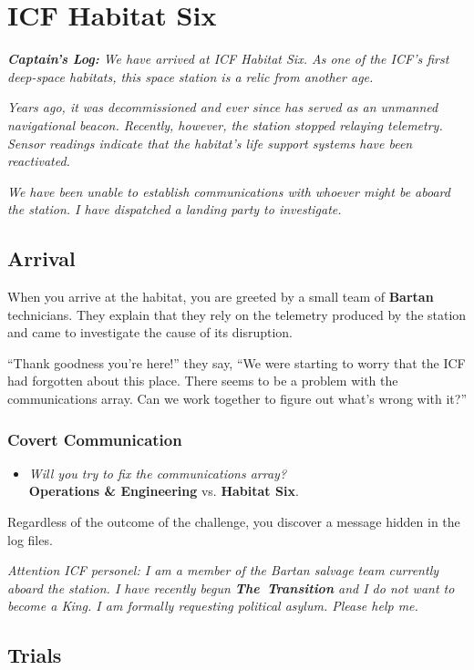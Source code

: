 \documentclass[11pt, a5paper, parskip=half-, DIV=12]{scrartcl}
\begin{document}
\section*{ICF Habitat Six}
\textit{\textbf{Captain's Log:} We have arrived at ICF Habitat Six. As one of the ICF's first deep-space habitats, this space station is a relic from another age.}

\textit{Years ago, it was decommissioned and ever since has served as an unmanned navigational beacon. Recently, however, the station stopped relaying telemetry. Sensor readings indicate that the habitat's life support systems have been reactivated.}

\textit{We have been unable to establish communications with whoever might be aboard the station. I have dispatched a landing party to investigate.}

\subsection*{Arrival}
When you arrive at the habitat, you are greeted by a small team of \textbf{Bartan} technicians. They explain that they rely on the telemetry produced by the station and came to investigate the cause of its disruption.

``Thank goodness you're here!'' they say, ``We were starting to worry that the ICF had forgotten about this place. There seems to be a problem with the communications array. Can we work together to figure out what's wrong with it?''

\subsubsection*{Covert Communication}
\begin{itemize}[topsep=0ex, partopsep=0ex]
	\item \textit{Will you try to fix the communications array?}\\ \textbf{Operations \& Engineering} vs. \textbf{Habitat Six}.
\end{itemize}
Regardless of the outcome of the challenge, you discover a message hidden in the log files.

\textit{Attention ICF personel: I am a member of the Bartan salvage team currently aboard the station. I have recently begun \textbf{The~Transition} and I do not want to become a King. I am formally requesting political asylum. Please help me.}

\newpage

\subsection*{Trials}
\end{document}
